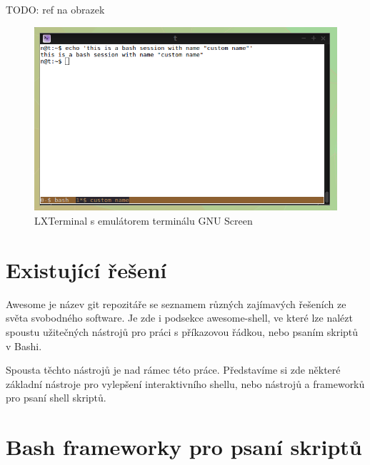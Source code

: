 \documentclass[thesis=M,czech]{FITthesis}[2012/06/26]
\begin{document}
TODO: ref na obrazek

\begin{figure}[htb]\centering
	\includegraphics[width=\textwidth]{./images/terminal_invert}
	\caption{LXTerminal s emulátorem terminálu GNU Screen}
	\label{fig:terminal_invert}
\end{figure}






\section{Existující řešení}

Awesome je název git repozitáře se seznamem různých zajímavých řešeních ze světa svobodného software. Je zde i podsekce awesome-shell, ve které lze nalézt spoustu užitečných nástrojů pro práci s příkazovou řádkou, nebo psaním skriptů v Bashi.

Spousta těchto nástrojů je nad rámec této práce. Představíme si zde některé základní nástroje pro vylepšení interaktivního shellu, nebo nástrojů a frameworků pro psaní shell skriptů.


\section{Bash frameworky pro psaní skriptů}
\end{document}
